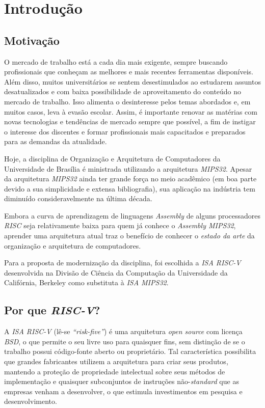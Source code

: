 \chapter{Introdução}\label{CapIntro}



\section{Motivação}

    {O mercado de trabalho está a cada dia mais exigente, sempre buscando profissionais que conheçam as melhores e mais recentes ferramentas disponíveis. Além disso, muitos universitários se sentem desestimulados ao estudarem assuntos desatualizados e com baixa possibilidade de aproveitamento do conteúdo no mercado de trabalho. Isso alimenta o desinteresse pelos temas abordados e, em muitos casos, leva à evasão escolar. Assim, é importante renovar as matérias com novas tecnologias e tendências de mercado sempre que possível, a fim de instigar o interesse dos discentes e formar profissionais mais capacitados e preparados para as demandas da atualidade.}

    {Hoje, a disciplina de Organização e Arquitetura de Computadores da Universidade de Brasília é ministrada utilizando a arquitetura \textit{MIPS32}. Apesar da arquitetura \textit{MIPS32} ainda ter grande força no meio acadêmico (em boa parte devido a sua simplicidade e extensa bibliografia), sua aplicação na indústria tem diminuído consideravelmente na última década.}

    {Embora a curva de aprendizagem de linguagens \textit{Assembly} de alguns processadores \textit{RISC} seja relativamente baixa para quem já conhece o \textit{Assembly MIPS32}, aprender uma arquitetura atual traz o benefício de conhecer o \textit{estado da arte} da organização e arquitetura de computadores.}

    {Para a proposta de modernização da disciplina, foi escolhida a \textit{ISA RISC-V} desenvolvida na Divisão de Ciência da Computação da Universidade da Califórnia, Berkeley como substituta à \textit{ISA MIPS32}.}


\section{Por que \textit{RISC-V}?}

    {A \textit{ISA RISC-V} (lê-se \textit{``risk-five''}) é uma arquitetura \textit{open source} com licença \textit{BSD}, o que permite o seu livre uso para quaisquer fins, sem distinção de se o trabalho possui código-fonte aberto ou proprietário. Tal característica possibilita que grandes fabricantes utilizem a arquitetura para criar seus produtos, mantendo a proteção de propriedade intelectual sobre seus métodos de implementação e quaisquer subconjuntos de instruções não-\textit{standard} que as empresas venham a desenvolver, o que estimula investimentos em pesquisa e desenvolvimento.}

